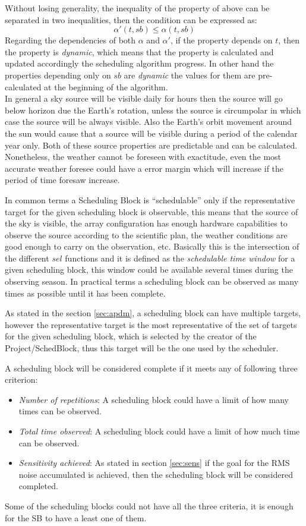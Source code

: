 \documentclass[11pt]{article}
\begin{document}
Without losing generality, the inequality of the property of above can be separated in two inequalities, then the condition can be expressed as: 
$$\alpha'(t, sb) \leq \alpha (t, sb)$$
Regarding the dependencies of both $\alpha$ and $\alpha'$, if the property depends on $t$, then the property is \textit{dynamic}, which means that the property is calculated and updated accordingly the scheduling algorithm progress. In other hand the properties depending only on $sb$ are \textit{dynamic} the values for them are pre-calculated at the beginning of the algorithm.\\

In general a sky source will be visible daily for hours then the source will go below horizon due the Earth's rotation, unless the source is circumpolar in which case the source will be always visible. Also the Earth's orbit movement around the sun would cause that a source will be visible during a period of the calendar year only. Both of these source properties are predictable and can be calculated. Nonetheless, the weather cannot be foreseen with exactitude, even the most accurate weather foresee could have a error margin which will increase if the period of time foresaw increase.

In common terms a Scheduling Block is ``schedulable'' only if the representative target for the given scheduling block is observable, this means that the source of the sky is visible, the array configuration has enough hardware capabilities to observe the source according to the scientific plan, the weather conditions are good enough to carry on the observation, etc. Basically this is the intersection of the different $sel$ functions and it is defined as the \textit{schedulable time window} for a given scheduling block, this window could be available several times during the observing season. In practical terms a scheduling block can be observed as many times as possible until it has been complete.

As stated in the section \ref{sec:apdm}, a scheduling block can have multiple targets, however the representative target is the most representative of the set of targets for the given scheduling block, which is selected by the creator of the Project/SchedBlock, thus this target will be the one used by the scheduler.

A scheduling block will be considered complete if it meets any of following three criterion:
\begin{itemize}
	\item \textit{Number of repetitions}: A scheduling block could have a limit of how many times can be observed.
	\item \textit{Total time observed}: A scheduling block could have a limit of how much time can be observed.
	\item \textit{Sensitivity achieved}: As stated in section \ref{sec:sens} if the goal for the RMS noise accumulated is achieved, then the scheduling block will be considered completed.
\end{itemize} 
Some of the scheduling blocks could not have all the three criteria, it is enough for the SB to have a least one of them.
\end{document}
